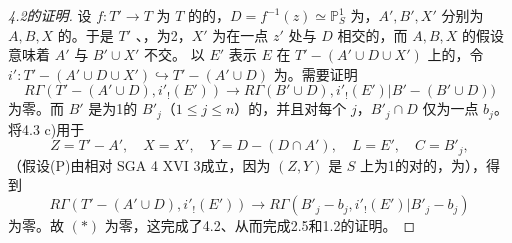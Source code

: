 \begin{proof}[4.2的证明]
设 $f:T'\to T$ 为 $T$ 的的，$D=f^{-1}(z)\simeq\mathbb P^1_S$ 为，$A',B',X'$ 分别为 $A,B,X$ 的。于是 $T'$ 、，为2，$X'$ 为在一点 $z'$ 处与 $D$ 相交的，而 $A,B,X$ 的假设意味着 $A'$ 与 $B'\cup X'$ 不交。
以 $E'$ 表示 $E$ 在 $T'-(A'\cup D\cup X')$ 上的，令 $i':T'-(A'\cup D\cup X')\hookrightarrow T'-(A'\cup D)$ 为。需要证明
\[
 R\Gamma(T'-(A'\cup D),i'_!(E'))\longrightarrow
 R\Gamma(B'\cup D),i'_!(E')|B'-(B'\cup D))\tag{$*$}
\]
为零。而 $B'$ 是为1的 $B'_j$（$1\leq j\leq n$）的，并且对每个 $j$，$B'_j\cap D$ 仅为一点 $b_j$。将4.3 c)用于
\[
 Z=T'-A',\quad X=X',\quad Y=D-(D\cap A'),\quad L=E',\quad C=B'_j,
\]
（假设(P)由相对 SGA 4 XVI 3成立，因为 $(Z,Y)$ 是 $S$ 上为1的对的，为），得到
\[
 R\Gamma(T'-(A'\cup D),i'_!(E'))\longrightarrow
 R\Gamma(B'_j-b_j,i'_!(E')|B'_j-b_j)
\]
为零。故 $(*)$ 为零，这完成了4.2、从而完成2.5和1.2的证明。
\end{proof}
